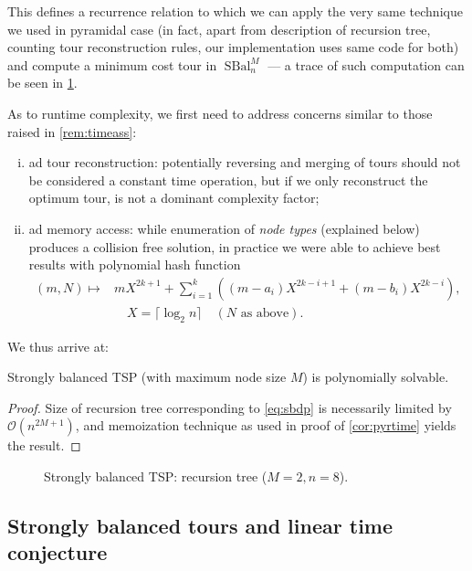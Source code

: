 \documentclass[index=totoc,bibliography=totoc]{scrartcl}
\newcommand{\annotation}[1]{\marginpar{\small\itshape\color{green}#1}}
\numberwithin{equation}{section}
\numberwithin{figure}{section}
\numberwithin{table}{section}
\let\defstyle\itshape
\begin{document}
This defines a recurrence relation to which we can apply the very same
technique we used in pyramidal case (in fact, apart from description of
recursion tree, counting tour reconstruction rules, our implementation uses
same code for both) and compute a minimum cost tour in
$\operatorname{SBal}_n^M$ --- a trace of such computation can be seen in
\cref{fig:sbtrace}.

As to runtime complexity, we first need to address concerns similar to
those raised in
\cref{rem:timeass}:
\begin{enumerate}[(i)]
  \item
    ad tour reconstruction: potentially reversing and merging of tours
    should not be considered a constant time operation, but if we only
    reconstruct the optimum tour, is not a dominant complexity factor;
  \item
    ad memory access:
    while enumeration of {\defstyle node types} (explained below)
    produces a collision free solution,
    in practice we were able to achieve best results 
    with polynomial hash function
    \annotation{check implementation}
    \begin{align*}
      \left(m,N\right) \mapsto & mX^{2k+1}
        + \sum_{i=1}^k\left((m-a_i)X^{2k-i+1} + (m-b_i)X^{2k-i}\right),
      \\
      & \quad X = \lceil\log_2 n\rceil \quad (N \text{\ as above}).
    \end{align*}
\end{enumerate}

We thus arrive at:
\begin{corollary}
\label{cor:sbtime}
  Strongly balanced TSP (with maximum node size $M$) is polynomially solvable.
\end{corollary}
\begin{proof}
  Size of recursion tree corresponding to \cref{eq:sbdp} is
  necessarily limited by $\mathcal{O}\left(n^{2M+1}\right)$,
  and memoization technique as used in proof of \cref{cor:pyrtime}
  yields the result.
\end{proof}

\begin{figure}[htb]
  \centering
  \caption{Strongly balanced TSP: recursion tree ($M=2,n=8$).}
  \label{fig:sbtrace}
\end{figure}


\subsection{Strongly balanced tours and linear time conjecture}
\end{document}
